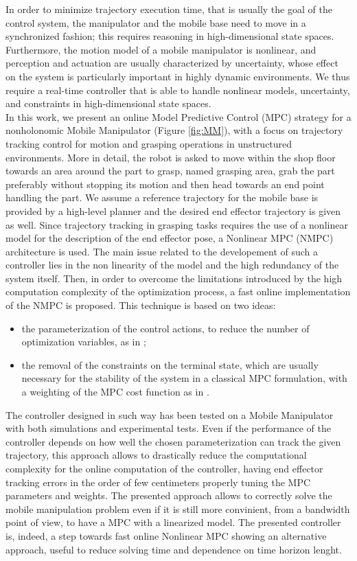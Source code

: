 In order to minimize trajectory execution time, that is usually the goal of the control system, the manipulator and the mobile base need to move in a synchronized fashion; this requires reasoning in high-dimensional state spaces.
Furthermore, the motion model of a mobile manipulator is nonlinear, and perception and actuation are usually characterized by uncertainty, whose effect on the system is particularly important in highly dynamic environments.
We thus require a real-time controller that is able to handle nonlinear models, uncertainty, and constraints in high-dimensional state spaces.\\
In this work, we present an online Model Predictive Control (MPC) strategy for a nonholonomic Mobile Manipulator (Figure \ref{fig:MM}), with a focus on trajectory tracking control for motion and grasping operations in unstructured environments. More in detail, the robot is asked to move within the shop floor towards an area around the part to grasp, named grasping area, grab the part preferably without stopping its motion and then head towards an end point handling the part.
We assume a reference trajectory for the mobile base is provided by a high-level planner%
and the desired end effector trajectory is given as well. Since trajectory tracking in grasping tasks requires the use of a nonlinear model for the description of the end effector pose, a Nonlinear MPC (NMPC) architecture is used. The main issue related to the developement of such a controller lies in the non linearity of the model and the high redundancy of the system itself. Then, in order to overcome the limitations introduced by the high computation complexity of the optimization process, a fast online implementation of the NMPC is proposed. This technique is based on two ideas:
\begin{itemize}
	\item the parameterization of the control actions, to reduce the number of optimization variables, as in \cite{Howard2007};
	\item the removal of the constraints on the terminal state, which are usually necessary for the stability of the system in a classical MPC formulation, with a weighting of the MPC cost function as in \cite{alamir2018stability}. 
\end{itemize}
The controller designed in such way has been tested on a Mobile Manipulator with both simulations and experimental tests. Even if the performance of the controller depends on how well the chosen parameterization can track the given trajectory, this approach allows to drastically reduce the computational complexity for the online computation of the controller, having end effector tracking errors in the order of few centimeters properly tuning the MPC parameters and weights. The presented approach allows to correctly solve the mobile manipulation problem even if it is still more convinient, from a bandwidth point of view, to have a MPC with a linearized model. The presented controller is, indeed, a step towards fast online Nonlinear MPC showing an alternative approach, useful to reduce solving time and dependence on time horizon lenght. \\

